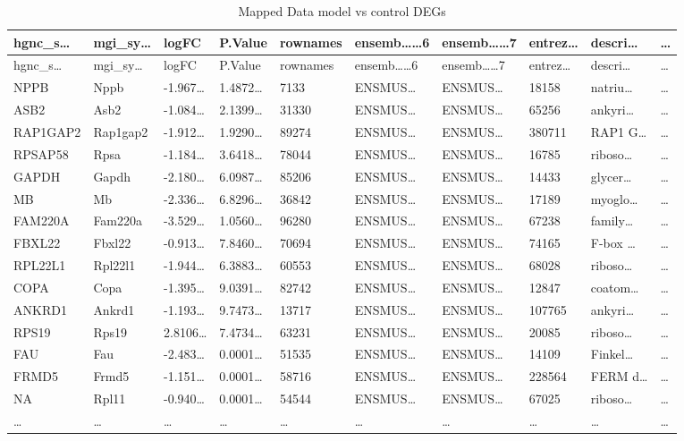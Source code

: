 \documentclass[
]{article}
\begin{document}
\begin{longtable}[]{@{}llllllllll@{}}
\caption{\label{tab:Mapped-Data-model-vs-control-DEGs}Mapped Data model vs control DEGs}\tabularnewline
\toprule
hgnc\_s\ldots{} & mgi\_sy\ldots{} & logFC & P.Value & rownames & ensemb\ldots\ldots6 & ensemb\ldots\ldots7 & entrez\ldots{} & descri\ldots{} & \ldots{}\tabularnewline
\midrule
\endfirsthead
\toprule
hgnc\_s\ldots{} & mgi\_sy\ldots{} & logFC & P.Value & rownames & ensemb\ldots\ldots6 & ensemb\ldots\ldots7 & entrez\ldots{} & descri\ldots{} & \ldots{}\tabularnewline
\midrule
\endhead
NPPB & Nppb & -1.967\ldots{} & 1.4872\ldots{} & 7133 & ENSMUS\ldots{} & ENSMUS\ldots{} & 18158 & natriu\ldots{} & \ldots{}\tabularnewline
ASB2 & Asb2 & -1.084\ldots{} & 2.1399\ldots{} & 31330 & ENSMUS\ldots{} & ENSMUS\ldots{} & 65256 & ankyri\ldots{} & \ldots{}\tabularnewline
RAP1GAP2 & Rap1gap2 & -1.912\ldots{} & 1.9290\ldots{} & 89274 & ENSMUS\ldots{} & ENSMUS\ldots{} & 380711 & RAP1 G\ldots{} & \ldots{}\tabularnewline
RPSAP58 & Rpsa & -1.184\ldots{} & 3.6418\ldots{} & 78044 & ENSMUS\ldots{} & ENSMUS\ldots{} & 16785 & riboso\ldots{} & \ldots{}\tabularnewline
GAPDH & Gapdh & -2.180\ldots{} & 6.0987\ldots{} & 85206 & ENSMUS\ldots{} & ENSMUS\ldots{} & 14433 & glycer\ldots{} & \ldots{}\tabularnewline
MB & Mb & -2.336\ldots{} & 6.8296\ldots{} & 36842 & ENSMUS\ldots{} & ENSMUS\ldots{} & 17189 & myoglo\ldots{} & \ldots{}\tabularnewline
FAM220A & Fam220a & -3.529\ldots{} & 1.0560\ldots{} & 96280 & ENSMUS\ldots{} & ENSMUS\ldots{} & 67238 & family\ldots{} & \ldots{}\tabularnewline
FBXL22 & Fbxl22 & -0.913\ldots{} & 7.8460\ldots{} & 70694 & ENSMUS\ldots{} & ENSMUS\ldots{} & 74165 & F-box \ldots{} & \ldots{}\tabularnewline
RPL22L1 & Rpl22l1 & -1.944\ldots{} & 6.3883\ldots{} & 60553 & ENSMUS\ldots{} & ENSMUS\ldots{} & 68028 & riboso\ldots{} & \ldots{}\tabularnewline
COPA & Copa & -1.395\ldots{} & 9.0391\ldots{} & 82742 & ENSMUS\ldots{} & ENSMUS\ldots{} & 12847 & coatom\ldots{} & \ldots{}\tabularnewline
ANKRD1 & Ankrd1 & -1.193\ldots{} & 9.7473\ldots{} & 13717 & ENSMUS\ldots{} & ENSMUS\ldots{} & 107765 & ankyri\ldots{} & \ldots{}\tabularnewline
RPS19 & Rps19 & 2.8106\ldots{} & 7.4734\ldots{} & 63231 & ENSMUS\ldots{} & ENSMUS\ldots{} & 20085 & riboso\ldots{} & \ldots{}\tabularnewline
FAU & Fau & -2.483\ldots{} & 0.0001\ldots{} & 51535 & ENSMUS\ldots{} & ENSMUS\ldots{} & 14109 & Finkel\ldots{} & \ldots{}\tabularnewline
FRMD5 & Frmd5 & -1.151\ldots{} & 0.0001\ldots{} & 58716 & ENSMUS\ldots{} & ENSMUS\ldots{} & 228564 & FERM d\ldots{} & \ldots{}\tabularnewline
NA & Rpl11 & -0.940\ldots{} & 0.0001\ldots{} & 54544 & ENSMUS\ldots{} & ENSMUS\ldots{} & 67025 & riboso\ldots{} & \ldots{}\tabularnewline
\ldots{} & \ldots{} & \ldots{} & \ldots{} & \ldots{} & \ldots{} & \ldots{} & \ldots{} & \ldots{} & \ldots{}\tabularnewline
\bottomrule
\end{longtable}
\end{document}
